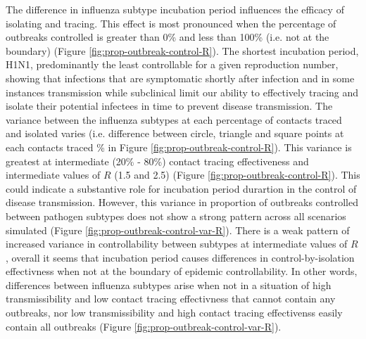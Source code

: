 \documentclass{article}
\begin{document}
The difference in influenza subtype incubation period influences the efficacy of isolating and tracing. This effect is most pronounced when the percentage of outbreaks controlled is greater than 0\% and less than 100\% (i.e. not at the boundary) (Figure \ref{fig:prop-outbreak-control-R}). The shortest incubation period, H1N1, predominantly the least controllable for a given reproduction number, showing that infections that are symptomatic shortly after infection and in some instances transmission while subclinical limit our ability to effectively tracing and isolate their potential infectees in time to prevent disease transmission. The variance between the influenza subtypes at each percentage of contacts traced and isolated varies (i.e. difference between circle, triangle and square points at each contacts traced \% in Figure \ref{fig:prop-outbreak-control-R}). This variance is greatest at intermediate (20\% - 80\%) contact tracing effectiveness and intermediate values of $R$ (1.5 and 2.5) (Figure \ref{fig:prop-outbreak-control-R}). This could indicate a substantive role for incubation period durartion in the control of disease transmission. However, this variance in proportion of outbreaks controlled between pathogen subtypes does not show a strong pattern across all scenarios simulated (Figure \ref{fig:prop-outbreak-control-var-R}). There is a weak pattern of increased variance in controllability between subtypes at intermediate values of $R$, overall it seems that incubation period causes differences in control-by-isolation effectivness when not at the boundary of epidemic controllability. In other words, differences between influenza subtypes arise when not in a situation of high transmissibility and low contact tracing effectivness that cannot contain any outbreaks, nor low transmissibility and high contact tracing effectivenss easily contain all outbreaks (Figure \ref{fig:prop-outbreak-control-var-R}). \\
\end{document}
